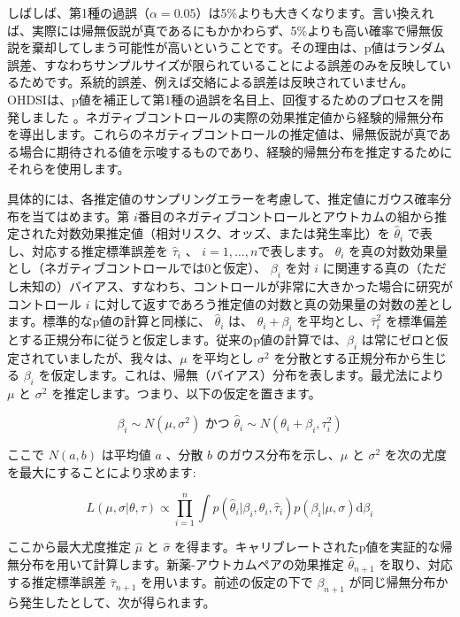 \documentclass[
  11pt]{book}
\theoremstyle{definition}
\theoremstyle{definition}
\theoremstyle{definition}
\theoremstyle{definition}
\theoremstyle{remark}
\begin{document}
しばしば、第1種の過誤（\(\alpha = 0.05\)）は5\%よりも大きくなります。言い換えれば、実際には帰無仮説が真であるにもかかわらず、5\%よりも高い確率で帰無仮説を棄却してしまう可能性が高いということです。その理由は、p値はランダム誤差、すなわちサンプルサイズが限られていることによる誤差のみを反映しているためです。系統的誤差、例えば交絡による誤差は反映されていません。OHDSIは、p値を補正して第1種の過誤を名目上、回復するためのプロセスを開発しました \citep{schuemie_2014}。ネガティブコントロールの実際の効果推定値から経験的帰無分布を導出します。これらのネガティブコントロールの推定値は、帰無仮説が真である場合に期待される値を示唆するものであり、経験的帰無分布を推定するためにそれらを使用します。

具体的には、各推定値のサンプリングエラーを考慮して、推定値にガウス確率分布を当てはめます。第 \(i\)番目のネガティブコントロールとアウトカムの組から推定された対数効果推定値（相対リスク、オッズ、または発生率比）を \(\hat{\theta}_i\) で表し、対応する推定標準誤差を \(\hat{\tau}_i\) 、 \(i=1,\ldots,n\)で表します。 \(\theta_i\) を真の対数効果量とし（ネガティブコントロールでは0と仮定）、 \(\beta_i\) を対 \(i\) に関連する真の（ただし未知の）バイアス、すなわち、コントロールが非常に大きかった場合に研究がコントロール \(i\) に対して返すであろう推定値の対数と真の効果量の対数の差とします。標準的なp値の計算と同様に、 \(\hat{\theta}_i\) は、 \(\theta_i + \beta_i\) を平均とし、\(\hat{\tau}_i^2\) を標準偏差とする正規分布に従うと仮定します。従来のp値の計算では、\(\beta_i\) は常にゼロと仮定されていましたが、我々は、\(\mu\) を平均とし \(\sigma^2\) を分散とする正規分布から生じる \(\beta_i\) を仮定します。これは、帰無（バイアス）分布を表します。最尤法により \(\mu\) と \(\sigma^2\) を推定します。つまり、以下の仮定を置きます。

\[\beta_i \sim N(\mu,\sigma^2) \text{ かつ } \hat{\theta}_i \sim N(\theta_i + \beta_i, \tau_i^2)\]

ここで \(N(a,b)\) は平均値 \(a\) 、分散 \(b\) のガウス分布を示し、\(\mu\) と \(\sigma^2\) を次の尤度を最大にすることにより求めます:

\[L(\mu, \sigma | \theta, \tau) \propto \prod_{i=1}^{n}\int p(\hat{\theta}_i|\beta_i, \theta_i, \hat{\tau}_i)p(\beta_i|\mu, \sigma) \text{d}\beta_i\]

ここから最大尤度推定 \(\hat{\mu}\) と \(\hat{\sigma}\) を得ます。キャリブレートされたp値を実証的な帰無分布を用いて計算します。新薬-アウトカムペアの効果推定 \(\hat{\theta}_{n+1}\) を取り、対応する推定標準誤差 \(\hat{\tau}_{n+1}\) を用います。前述の仮定の下で \(\beta_{n+1}\) が同じ帰無分布から発生したとして、次が得られます。
\end{document}
